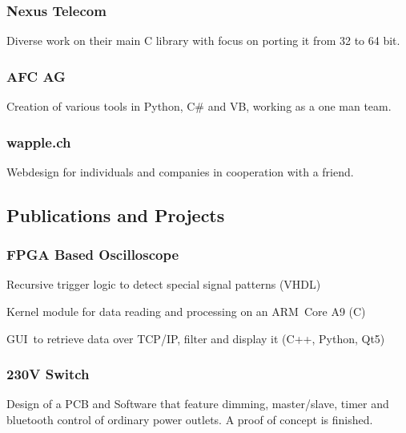 \documentclass[]{resume}
\begin{document}
\begin{timeline}
\subsubsection{Nexus Telecom}
Diverse work on their main C library with focus on porting it from 32 to 64 bit.
\sectionsep

\subsubsection{AFC AG}
Creation of various tools in Python, C\# and VB, working as a one man team.
\sectionsep

\subsubsection{wapple.ch}
Webdesign for individuals and companies in cooperation with a friend.
\sectionsep


\subsection{Publications and Projects}

\subsubsection{FPGA Based Oscilloscope}
\vspace{\topsep} %
\begin{tightemize}
\item Recursive trigger logic to detect special signal patterns (VHDL)
\item Kernel module for data reading and processing on an ARM Core A9 (C)
\item GUI to retrieve data over TCP/IP, filter and display it (C++, Python, Qt5)
\end{tightemize}
\sectionsep

\subsubsection{230V Switch}
Design of a PCB and Software that feature dimming, master/slave, timer and bluetooth control of ordinary power outlets. A proof of concept is finished.
\sectionsep


\end{timeline}
\end{document}

